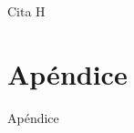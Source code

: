 \documentclass[fleqn]{Paquetes/RevDigMatEduInt}
\begin{document}


\begin{thebibliography}{AAAAA}
	 Cita H
\end{thebibliography}

\appendix

\section{Apéndice}

Apéndice
\end{document}
